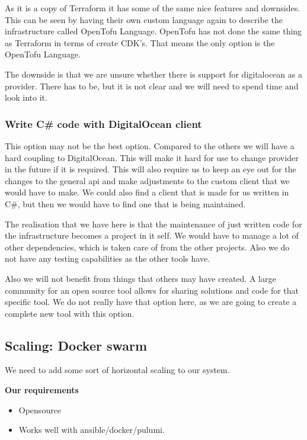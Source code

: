 As it is a copy of Terraform it has some of the same nice features and downsides. This can be seen by having their own custom language again to describe the infrastructure called OpenTofu Language. OpenTofu has not done the same thing as Terraform in terms of create CDK’s. That means the only option is the OpenTofu Language. 

The downside is that we are unsure whether there is support for digitalocean as a provider. There has to be, but it is not clear and we will need to spend time and look into it. 

\subsubsection{Write C\# code with DigitalOcean client}

This option may not be the best option. Compared to the others we will have a hard coupling to DigitalOcean. This will make it hard for use to change provider in the future if it is required. This will also require us to keep an eye out for the changes to the general api and make adjustments to the custom client that we would have to make. We could also find a client that is made for us written in C\#, but then we would have to find one that is being maintained. 

The realisation that we have here is that the maintenance of just written code for the infrastructure becomes a project in it self. We would have to manage a lot of other dependencies, which is taken care of from the other projects. Also we do not have any testing capabilities as the other tools have.  

Also we will not benefit from things that others may have created. A large community for an open source tool allows for sharing solutions and code for that specific tool. We do not really have that option here, as we are going to create a complete new tool with this option. 

\subsection{Scaling: Docker swarm}

We need to add some sort of horizontal scaling to our system.

\textbf{Our requirements}

\begin{itemize}
    \item Opensource
    \item Works well with ansible/docker/pulumi.
\end{itemize}

